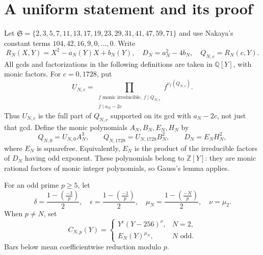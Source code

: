 \section{A uniform statement and its proof}
Let $\mathfrak S=\{2,3,5,7,11,13,17,19,23,29,31,41,47,59,71\}$ and use Nakaya's constant terms $104,42,16,9,0,\ldots,0$. Write
\[
 R_N(X,Y)=X^2-a_N(Y)X+b_N(Y),\quad D_N=a_N^2-4b_N,
 \quad Q_{N,c}=R_N(c,Y).
\]
All gcds and factorizations in the following definitions are taken in $\mathbb Q[Y]$, with monic factors. For $c=0,1728$, put
\begin{equation}\label{eq:U}
 U_{N,c}=\prod_{\substack{f\text{ monic irreducible},\ f\mid Q_{N,c}\\
 f\mid a_N-2c}} f^{v_f(Q_{N,c})}.
\end{equation}
Thus $U_{N,c}$ is the full part of $Q_{N,c}$ supported on its gcd with $a_N-2c$, not just that gcd. Define the monic polynomials $A_N,B_N,E_N,H_N$ by
\begin{equation}\label{eq:ABC}
 Q_{N,0}=U_{N,0}A_N^3,\qquad Q_{N,1728}=U_{N,1728}B_N^2,
 \qquad D_N=E_NH_N^2,
\end{equation}
where $E_N$ is squarefree. Equivalently, $E_N$ is the product of the irreducible factors of $D_N$ having odd exponent. These polynomials belong to $\mathbb Z[Y]$: they are monic rational factors of monic integer polynomials, so Gauss's lemma applies.

For an odd prime $p\ge5$, let
\[
 \delta=\frac{1-\left(\frac{-3}{p}\right)}2,\quad
 \epsilon=\frac{1-\left(\frac{-1}{p}\right)}2,\quad
 \mu_N=\frac{1-\left(\frac{-N}{p}\right)}2,\quad \nu=\mu_2.
\]
When $p\ne N$, set
\begin{equation}\label{eq:C}
 C_{N,p}(Y)=
 \begin{cases}
 Y^\epsilon(Y-256)^\nu,&N=2,\\
 E_N(Y)^{\mu_N},&N\text{ odd}.
 \end{cases}
\end{equation}
Bars below mean coefficientwise reduction modulo $p$.

